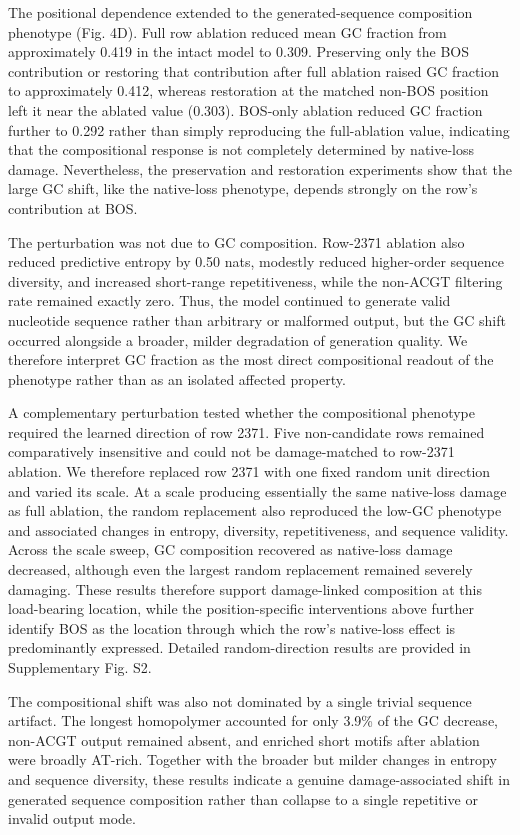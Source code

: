 \documentclass[11pt]{article}
\begin{document}
The positional dependence extended to the generated-sequence composition phenotype (Fig. 4D). Full row ablation reduced mean GC fraction from approximately 0.419 in the intact model to 0.309. Preserving only the BOS contribution or restoring that contribution after full ablation raised GC fraction to approximately 0.412, whereas restoration at the matched non-BOS position left it near the ablated value (0.303). BOS-only ablation reduced GC fraction further to 0.292 rather than simply reproducing the full-ablation value, indicating that the compositional response is not completely determined by native-loss damage. Nevertheless, the preservation and restoration experiments show that the large GC shift, like the native-loss phenotype, depends strongly on the row’s contribution at BOS.

The perturbation was not due to GC composition. Row-2371 ablation also reduced predictive entropy by 0.50 nats, modestly reduced higher-order sequence diversity, and increased short-range repetitiveness, while the non-ACGT filtering rate remained exactly zero. Thus, the model continued to generate valid nucleotide sequence rather than arbitrary or malformed output, but the GC shift occurred alongside a broader, milder degradation of generation quality. We therefore interpret GC fraction as the most direct compositional readout of the phenotype rather than as an isolated affected property.

A complementary perturbation tested whether the compositional phenotype required the learned direction of row 2371. Five non-candidate rows remained comparatively insensitive and could not be damage-matched to row-2371 ablation. We therefore replaced row 2371 with one fixed random unit direction and varied its scale. At a scale producing essentially the same native-loss damage as full ablation, the random replacement also reproduced the low-GC phenotype and associated changes in entropy, diversity, repetitiveness, and sequence validity. Across the scale sweep, GC composition recovered as native-loss damage decreased, although even the largest random replacement remained severely damaging. These results therefore support damage-linked composition at this load-bearing location, while the position-specific interventions above further identify BOS as the location through which the row’s native-loss effect is predominantly expressed. Detailed random-direction results are provided in Supplementary Fig. S2.

The compositional shift was also not dominated by a single trivial sequence artifact. The longest homopolymer accounted for only 3.9\% of the GC decrease, non-ACGT output remained absent, and enriched short motifs after ablation were broadly AT-rich. Together with the broader but milder changes in entropy and sequence diversity, these results indicate a genuine damage-associated shift in generated sequence composition rather than collapse to a single repetitive or invalid output mode.
\end{document}
